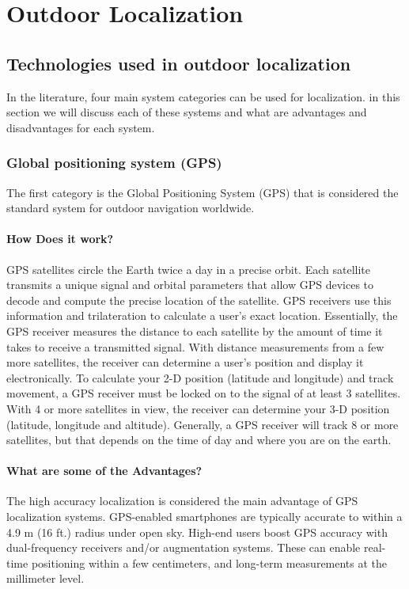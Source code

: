\chapter{Outdoor Localization}
\section{Technologies used in outdoor localization}
 In the literature, four main system categories can be used for localization. in this section we will discuss each of these systems and what are advantages and disadvantages for each system.
\subsection{Global positioning system (GPS)}
The first category is the Global Positioning System (GPS) that is considered the standard system for outdoor navigation worldwide.\cite{6295661}
\subsubsection{How Does it work?}
GPS satellites circle the Earth twice a day in a precise orbit.
Each satellite transmits a unique signal and orbital parameters that allow GPS devices to decode and compute the precise location of the satellite.
GPS receivers use this information and trilateration to calculate a user's exact location.
Essentially, the GPS receiver measures the distance to each satellite by the amount of time it takes to receive a transmitted signal.
With distance measurements from a few more satellites, the receiver can determine a user's position and display it electronically.
To calculate your 2-D position (latitude and longitude) and track movement, a GPS receiver must be locked on to the signal of at least 3 satellites.
With 4 or more satellites in view, the receiver can determine your 3-D position (latitude, longitude and altitude).
Generally, a GPS receiver will track 8 or more satellites, but that depends on the time of day and where you are on the earth.\cite{web:Garmin}
\subsubsection{What are some of the Advantages?}
The high accuracy localization is considered the main advantage of GPS localization systems.
GPS-enabled smartphones are typically accurate to within a 4.9 m (16 ft.) radius under open sky.
High-end users boost GPS accuracy with dual-frequency receivers and/or augmentation systems.
These can enable real-time positioning within a few centimeters, and long-term measurements at the millimeter level.\cite{web:GPS.gov}
